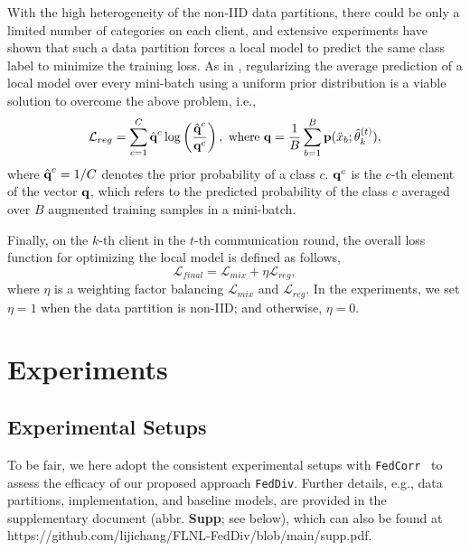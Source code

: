 \documentclass[letterpaper]{article} %
\begin{document}
With the high heterogeneity of the non-IID data partitions, there could be only a limited number of categories on each client, and extensive experiments have shown that such a data partition forces a local model to predict the same class label to minimize the training loss. As in \cite{tanaka2018joint, arazo2019unsupervised}, regularizing the average prediction of a local model over every mini-batch using a uniform prior distribution is a viable solution to overcome the above problem, i.e.,
\begin{equation}
    \fontsize{9.65pt}{12pt}\selectfont
    \mathcal{L}_{reg} = \sum_{c=1}^{C} \hat{\textbf{\text{q}}}^{c} \log \left(\frac{\hat{\textbf{\text{q}}}^{c}}{\textbf{\text{q}}^{c}}\right), \text{ where } \textbf{\text{q}}=\frac{1}{B} \sum_{b=1}^{B} \textbf{\text{p}}(\ddot{x}_b;\hat{{\theta}}^{(t)}_k),
\end{equation}
where $\hat{\textbf{\text{q}}}^{c}={1}/{C}$ denotes the prior probability of a class $c$. $\textbf{\text{q}}^c$ is the $c$-th element of the vector $\textbf{\text{q}}$, which refers to the predicted probability of the class $c$ averaged over $B$ augmented training samples in a mini-batch.

Finally, on the $k$-th client in the $t$-th communication round, the overall loss function for optimizing the local model is defined as follows,
\begin{equation}
    \label{Equation:Final-Loss}
    \mathcal{L}_{final} = \mathcal{L}_{mix} + \eta \mathcal{L}_{reg},
\end{equation}
where $\eta$ is a weighting factor balancing $\mathcal{L}_{mix}$ and $\mathcal{L}_{reg}$. In the experiments, we set $\eta=1$ when the data partition is non-IID; and otherwise, $\eta=0$.



\section{Experiments}

\subsection{Experimental Setups}

To be fair, we here adopt the consistent experimental setups with \texttt{FedCorr}~\cite{xu2022fedcorr} to assess the efficacy of our proposed approach \texttt{FedDiv}. Further details, e.g., data partitions, implementation, and baseline models, are provided in the supplementary document (abbr. \textbf{Supp}; see below), which can also be found at {{https://github.com/lijichang/FLNL-FedDiv/blob/main/supp.pdf}}.
\end{document}
